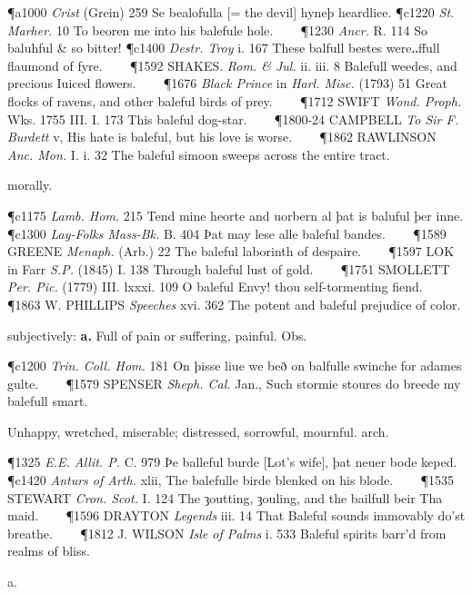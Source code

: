 \begin{description}[wide, labelwidth=!, labelindent=0pt]
\begin{myenumerate}
\P a1000 \textit{Crist}  (Grein) 259 Se bealofulla [= the devil] hyneþ heardlice.
\P c1220 \textit{St. Marher.}  10 To beoren me into his balefule hole.    
\P 1230 \textit{Ancr.} R. 114 So baluhful \& so bitter!
\P c1400 \textit{Destr. Troy} i. 167 These balfull bestes were‥ffull flaumond of fyre.    
\P 1592 SHAKES.  \textit{Rom. \& Jul.} ii. iii. 8 Balefull weedes, and precious Iuiced flowers.    
\P 1676 \textit{Black  Prince} in \textit{Harl. Misc.} (1793) 51 Great flocks of ravens, and other baleful birds of prey.    
\P 1712 SWIFT  \textit{Wond. Proph.} Wks. 1755 III. I. 173 This baleful dog-star.    
\P 1800-24 CAMPBELL  \textit{To Sir F. Burdett} v, His hate is baleful, but his love is worse.    
\P 1862 RAWLINSON  \textit{Anc. Mon.} I. i. 32 The baleful simoon sweeps across the entire tract.

 morally.

\P c1175 \textit{Lamb.  Hom.} 215 Tend mine heorte and uorbern al þat is baluful þer inne.
\P c1300 \textit{Lay-Folks  Mass-Bk.} B. 404 Þat may lese alle baleful bandes.    
\P 1589 GREENE  \textit{Menaph.} (Arb.) 22 The baleful laborinth of despaire.    
\P 1597 LOK in Farr \textit{S.P.} (1845) I. 138 Through baleful lust of gold.    
\P 1751 SMOLLETT  \textit{Per. Pic.} (1779) III. lxxxi. 109 O baleful Envy! thou self-tormenting fiend.    
\P 1863 W. PHILLIPS  \textit{Speeches} xvi. 362 The potent and baleful prejudice of color.

 subjectively: \textbf{a.} Full of pain or suffering, painful. Obs.

\P c1200 \textit{Trin. Coll. Hom.} 181 On þisse liue we beð on balfulle swinche for adames gulte.    
\P 1579 SPENSER  \textit{Sheph. Cal.} Jan., Such stormie stoures do breede my balefull smart.

 Unhappy, wretched, miserable; distressed, sorrowful, mournful. arch.

\P 1325 \textit{E.E. Allit. P.} C. 979 Þe balleful burde [Lot's wife], þat neuer bode keped.
\P c1420 \textit{Anturs  of Arth.} xlii, The balefulle birde blenked on his blode.    
\P 1535 STEWART  \textit{Cron. Scot.} I. 124 The ȝoutting, ȝouling, and the bailfull beir Tha maid.    
\P 1596 DRAYTON  \textit{Legends} iii. 14 That Baleful sounds immovably do'st breathe.    
\P 1812 J. WILSON  \textit{Isle of Palms} i. 533 Baleful spirits barr'd from realms of bliss.
\end{myenumerate}


 a.


\end{description}
